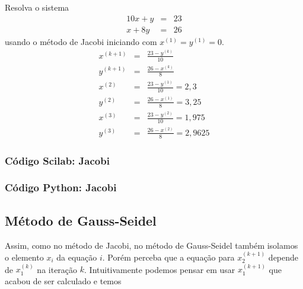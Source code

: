 \begin{ex}
Resolva o sistema
\begin{eqnarray*}
 10x+y&=&23\\
 x+8y &=&26
\end{eqnarray*}
usando o método de Jacobi iniciando com $x^{(1)}=y^{(1)}=0$.
\begin{eqnarray*}
x^{(k+1)}&=&\frac{23-y^{(k)}}{10}\\
y^{(k+1)}&=&\frac{26-x^{(k)}}{8}\\
x^{(2)}&=&\frac{23-y^{(1)}}{10}=2,3\\
y^{(2)}&=&\frac{26-x^{(1)}}{8}=3,25\\
x^{(3)}&=&\frac{23-y^{(2)}}{10}=1,975 \\
y^{(3)}&=&\frac{26-x^{(2)}}{8}=2,9625
\end{eqnarray*}
\end{ex}

\ifisscilab
\subsubsection{Código Scilab: Jacobi}


\fi

\ifispython
\subsubsection{Código Python: Jacobi}


\fi

\subsection{Método de Gauss-Seidel}

Assim, como no método de Jacobi, no método de Gauss-Seidel também isolamos o elemento $x_i$ da equação $i$. Porém perceba que a equação para $x_2^{(k+1)}$ depende de $x_1^{(k)}$ na iteração $k$. Intuitivamente podemos pensar em usar $x_1^{(k+1)}$ que acabou de ser calculado e temos


